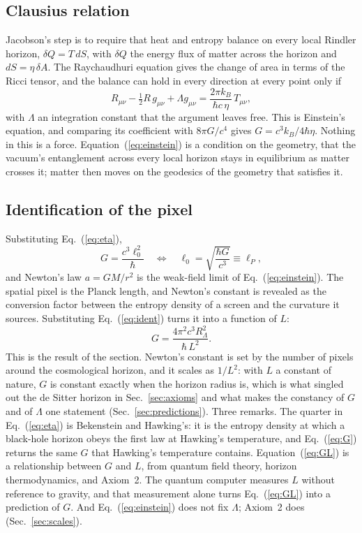 \documentclass[aps,prd,twocolumn,superscriptaddress,nofootinbib,showkeys]{revtex4-2}
\begin{document}
\subsection{Clausius relation}
Jacobson's step is to require that heat and entropy balance on every local Rindler horizon, $\delta Q = T\,dS$, with $\delta Q$ the energy flux of matter across the horizon and $dS = \eta\,\delta A$. The Raychaudhuri equation gives the change of area in terms of the Ricci tensor, and the balance can hold in every direction at every point only if
\begin{equation}
R_{\mu\nu} - \tfrac12 R\,g_{\mu\nu} + \Lambda g_{\mu\nu} = \frac{2\pi k_B}{\hbar c\,\eta}\,T_{\mu\nu},
\label{eq:einstein}
\end{equation}
with $\Lambda$ an integration constant that the argument leaves free. This is Einstein's equation, and comparing its coefficient with $8\pi G/c^4$ gives $G = c^3k_B/4\hbar\eta$. Nothing in this is a force. Equation~(\ref{eq:einstein}) is a condition on the geometry, that the vacuum's entanglement across every local horizon stays in equilibrium as matter crosses it; matter then moves on the geodesics of the geometry that satisfies it.

\subsection{Identification of the pixel}
Substituting Eq.~(\ref{eq:eta}),
\begin{equation}
G = \frac{c^3\ell_0^2}{\hbar}
\quad\Longleftrightarrow\quad
\ell_0 = \sqrt{\frac{\hbar G}{c^3}} \equiv \ell_P ,
\label{eq:G}
\end{equation}
and Newton's law $a = GM/r^2$ is the weak-field limit of Eq.~(\ref{eq:einstein}). The spatial pixel is the Planck length, and Newton's constant is revealed as the conversion factor between the entropy density of a screen and the curvature it sources. Substituting Eq.~(\ref{eq:ident}) turns it into a function of $L$:
\begin{equation}
G = \frac{4\pi^2 c^3 R_\Lambda^2}{\hbar\,L^2}.
\label{eq:GL}
\end{equation}
This is the result of the section. Newton's constant is set by the number of pixels around the cosmological horizon, and it scales as $1/L^2$: with $L$ a constant of nature, $G$ is constant exactly when the horizon radius is, which is what singled out the de Sitter horizon in Sec.~\ref{sec:axioms} and what makes the constancy of $G$ and of $\Lambda$ one statement (Sec.~\ref{sec:predictions}). Three remarks. The quarter in Eq.~(\ref{eq:eta}) is Bekenstein and Hawking's: it is the entropy density at which a black-hole horizon obeys the first law at Hawking's temperature, and Eq.~(\ref{eq:G}) returns the same $G$ that Hawking's temperature contains. Equation~(\ref{eq:GL}) is a relationship between $G$ and $L$, from quantum field theory, horizon thermodynamics, and Axiom~2. The quantum computer measures $L$ without reference to gravity, and that measurement alone turns Eq.~(\ref{eq:GL}) into a prediction of $G$. And Eq.~(\ref{eq:einstein}) does not fix $\Lambda$; Axiom~2 does (Sec.~\ref{sec:scales}).
\end{document}
